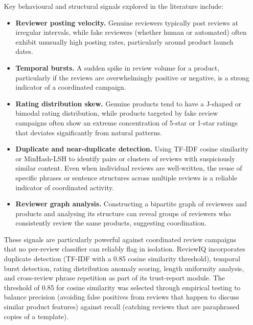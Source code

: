 \documentclass[12pt,a4paper,oneside]{report}
\begin{document}
Key behavioural and structural signals explored in the literature include:

\begin{itemize}[leftmargin=*]
  \item \textbf{Reviewer posting velocity.} Genuine reviewers typically
        post reviews at irregular intervals, while fake reviewers (whether
        human or automated) often exhibit unusually high posting rates,
        particularly around product launch dates.
  \item \textbf{Temporal bursts.} A sudden spike in review volume for a
        product, particularly if the reviews are overwhelmingly positive
        or negative, is a strong indicator of a coordinated campaign.
  \item \textbf{Rating distribution skew.} Genuine products tend to have
        a J-shaped or bimodal rating distribution, while products targeted
        by fake review campaigns often show an extreme concentration of
        5-star or 1-star ratings that deviates significantly from natural
        patterns.
  \item \textbf{Duplicate and near-duplicate detection.} Using TF-IDF
        cosine similarity or MinHash-LSH to identify pairs or clusters of
        reviews with suspiciously similar content. Even when individual
        reviews are well-written, the reuse of specific phrases or
        sentence structures across multiple reviews is a reliable
        indicator of coordinated activity.
  \item \textbf{Reviewer graph analysis.} Constructing a bipartite graph
        of reviewers and products and analysing its structure can reveal
        groups of reviewers who consistently review the same products,
        suggesting coordination.
\end{itemize}

These signals are particularly powerful against coordinated
review campaigns that no per-review classifier can reliably flag in
isolation. ReviewIQ incorporates duplicate detection (TF-IDF with a 0.85
cosine similarity threshold), temporal burst detection, rating
distribution anomaly scoring, length uniformity analysis, and
cross-review phrase repetition as part of its trust-report module. The
threshold of 0.85 for cosine similarity was selected through empirical
testing to balance precision (avoiding false positives from reviews that
happen to discuss similar product features) against recall (catching
reviews that are paraphrased copies of a template).
\end{document}
